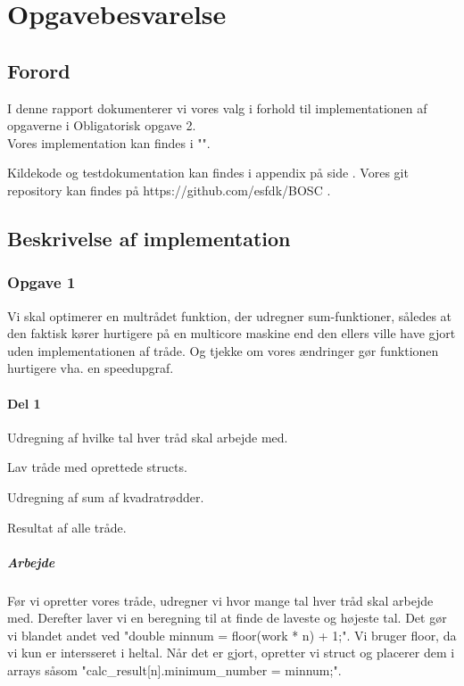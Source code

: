 \chapter{Opgavebesvarelse}
\section{Forord}
I denne rapport dokumenterer vi vores valg i forhold til implementationen af opgaverne i Obligatorisk opgave 2.
\\Vores implementation kan findes i "".

Kildekode og testdokumentation kan findes i appendix på side \pageref{Appendix}. Vores git repository kan findes på https://github.com/esfdk/BOSC .

\section{}

\section{Beskrivelse af implementation}
\subsection{Opgave 1}
\label{O1}
Vi skal optimerer en multrådet funktion, der udregner sum-funktioner, således at den faktisk kører hurtigere på en multicore maskine end den ellers ville have gjort uden implementationen af tråde. Og tjekke om vores ændringer gør funktionen hurtigere vha. en speedupgraf.

\subsubsection{Del 1}
\label{O1_1}
\begin{my_itemize}
\item Udregning af hvilke tal hver tråd skal arbejde med.
\item Lav tråde med oprettede structs.
\item Udregning af sum af kvadratrødder.
\item Resultat af alle tråde.
\end{my_itemize}
\paragraph{Arbejde} Før vi opretter vores tråde, udregner vi hvor mange tal hver tråd skal arbejde med. Derefter laver vi en beregning til at finde de laveste og højeste tal. Det gør vi blandet andet ved "double minnum = floor(work * n) + 1;". Vi bruger floor, da vi kun er intersseret i heltal. Når det er gjort, opretter vi struct og placerer dem i arrays såsom "calc_result[n].minimum_number = minnum;". 
